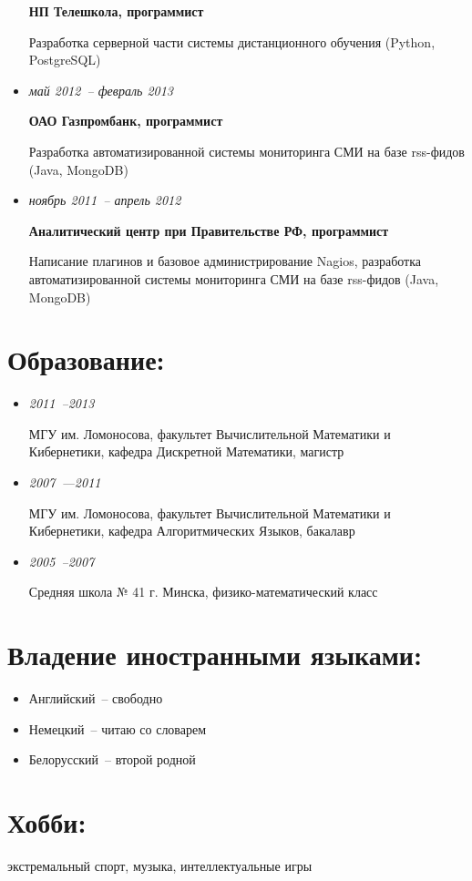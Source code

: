 \documentclass{res}
\begin{document}
\begin{resume}
\begin{itemize}
                \textbf{НП Телешкола, программист}

                Разработка серверной части системы дистанционного обучения (Python, PostgreSQL)

            \item \textit{май 2012~-- февраль 2013} 
                
                \textbf{ОАО Газпромбанк, программист}

                Разработка автоматизированной системы мониторинга СМИ на базе rss-фидов (Java, MongoDB)

            \item \textit{ноябрь 2011~-- апрель 2012}
                
                \textbf{Аналитический центр при Правительстве РФ, программист} 

                Написание плагинов и базовое администрирование Nagios, 
                разработка автоматизированной системы мониторинга СМИ на базе rss-фидов (Java, MongoDB)
        \end{itemize}

        \section{Образование:}
        \begin{itemize}
          \item \textit{2011~--2013}
              
              МГУ им. Ломоносова, факультет Вычислительной Математики и Кибернетики, 
              кафедра Дискретной Математики, магистр

            \item \textit{2007~---2011}
                
                МГУ им. Ломоносова, факультет Вычислительной Математики и Кибернетики, 
                кафедра Алгоритмических Языков, бакалавр

            \item \textit{2005~--2007}
                
                Средняя школа № 41 г. Минска, физико-математический класс
        \end{itemize}

    \section{Владение иностранными языками:}
        \begin{itemize}
            \item Английский~-- свободно
            \item Немецкий~-- читаю со словарем
            \item Белорусский~-- второй родной
        \end{itemize}


    \section{Хобби:} экстремальный спорт, музыка, интеллектуальные игры
    
\end{resume}
\end{document}
